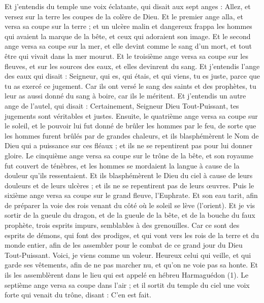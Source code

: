 \begin{multicols}{2}
\VerseOne{}Et j’entendis du temple une voix éclatante, qui disait aux sept anges : Allez, et versez sur la terre les coupes de la colère de Dieu.
Et le premier ange alla, et versa sa coupe sur la terre ; et un ulcère malin et dangereux frappa les hommes qui avaient la marque de la bête, et ceux qui adoraient son image.
Et le second ange versa sa coupe sur la mer, et elle devint comme le sang d'un mort, et tout être qui vivait dans la mer mourut.
Et le troisième ange versa sa coupe sur les fleuves, et sur les sources des eaux, et elles devinrent du sang.
Et j'entendis l'ange des eaux qui disait : Seigneur, qui es, qui étais, et qui viens, tu es juste, parce que tu as exercé ce jugement.
Car ils ont versé le sang des saints et des prophètes, tu leur as aussi donné du sang à boire, car ils le méritent.
Et j’entendis un autre ange de l’autel, qui disait : Certainement, Seigneur Dieu Tout-Puissant, tes jugements sont véritables et justes.
Ensuite, le quatrième ange versa sa coupe sur le soleil, et le pouvoir lui fut donné de brûler les hommes par le feu,
de sorte que les hommes furent brûlés par de grandes chaleurs, et ils blasphémèrent le Nom de Dieu qui a puissance sur ces fléaux ; et ils ne se repentirent pas pour lui donner gloire.
Le cinquième ange versa sa coupe sur le trône de la bête, et son royaume fut couvert de ténèbres, et les hommes se mordaient la langue à cause de la douleur qu'ils ressentaient.
Et ils blasphémèrent le Dieu du ciel à cause de leurs douleurs et de leurs ulcères ; et ils ne se repentirent pas de leurs œuvres.
Puis le sixième ange versa sa coupe sur le grand fleuve, l’Euphrate. Et son eau tarit, afin de préparer la voie des rois venant du côté où le soleil se lève (l’orient).
Et je vis sortir de la gueule du dragon, et de la gueule de la bête, et de la bouche du faux prophète, trois esprits impurs, semblables à des grenouilles.
Car ce sont des esprits de démons, qui font des prodiges, et qui vont vers les rois de la terre et du monde entier, afin de les assembler pour le combat de ce grand jour du Dieu Tout-Puissant.
Voici, je viens comme un voleur. Heureux celui qui veille, et qui garde ses vêtements, afin de ne pas marcher nu, et qu'on ne voie pas sa honte.
Et ils les assemblèrent dans le lieu qui est appelé en hébreu Harmaguédon (1).
Le septième ange versa sa coupe dans l'air ; et il sortit du temple du ciel une voix forte qui venait du trône, disant : C’en est fait.

\end{multicols}

